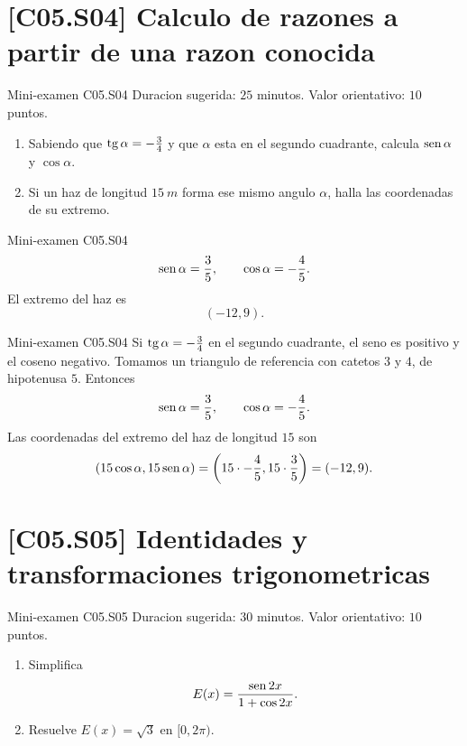 \section{[C05.S04] Calculo de razones a partir de una razon conocida}

\begin{exambrief}{Mini-examen C05.S04}
Duracion sugerida: \(25\) minutos. Valor orientativo: \(10\) puntos.
\begin{enumerate}
  \item Sabiendo que \(\operatorname{tg}\alpha=-\frac34\) y que \(\alpha\) esta en el segundo cuadrante,
  calcula \(\operatorname{sen}\alpha\) y \(\cos\alpha\).
  \item Si un haz de longitud \(\SI{15}{m}\) forma ese mismo angulo \(\alpha\), halla las
  coordenadas de su extremo.
\end{enumerate}
\end{exambrief}

\begin{shortanswer}{Mini-examen C05.S04}
\[
\operatorname{sen}\alpha=\frac35,
\qquad
\cos\alpha=-\frac45.
\]
El extremo del haz es
\[
(-12,9).
\]
\end{shortanswer}

\begin{fullsolution}{Mini-examen C05.S04}
Si \(\operatorname{tg}\alpha=-\frac34\) en el segundo cuadrante, el seno es positivo y el coseno negativo.
Tomamos un triangulo de referencia con catetos \(3\) y \(4\), de hipotenusa \(5\). Entonces
\[
\operatorname{sen}\alpha=\frac35,
\qquad
\cos\alpha=-\frac45.
\]
Las coordenadas del extremo del haz de longitud \(15\) son
\[
(15\cos\alpha,15\operatorname{sen}\alpha)=\left(15\cdot -\frac45,15\cdot \frac35\right)=(-12,9).
\]
\end{fullsolution}

\section{[C05.S05] Identidades y transformaciones trigonometricas}

\begin{exambrief}{Mini-examen C05.S05}
Duracion sugerida: \(30\) minutos. Valor orientativo: \(10\) puntos.
\begin{enumerate}
  \item Simplifica
  \[
  E(x)=\frac{\operatorname{sen} 2x}{1+\cos 2x}.
  \]
  \item Resuelve \(E(x)=\sqrt3\) en \([0,2\pi)\).
\end{enumerate}
\end{exambrief}

